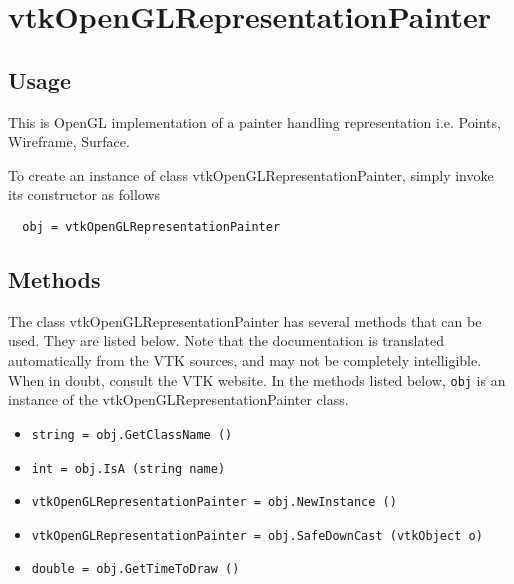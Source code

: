 \section{vtkOpenGLRepresentationPainter}

\subsection{Usage}

 This is OpenGL implementation of a painter handling representation 
 i.e. Points, Wireframe, Surface.

To create an instance of class vtkOpenGLRepresentationPainter, simply
invoke its constructor as follows
\begin{verbatim}
  obj = vtkOpenGLRepresentationPainter
\end{verbatim}
\subsection{Methods}

The class vtkOpenGLRepresentationPainter has several methods that can be used.
  They are listed below.
Note that the documentation is translated automatically from the VTK sources,
and may not be completely intelligible.  When in doubt, consult the VTK website.
In the methods listed below, \verb|obj| is an instance of the vtkOpenGLRepresentationPainter class.
\begin{itemize}
\item  \verb|string = obj.GetClassName ()|

\item  \verb|int = obj.IsA (string name)|

\item  \verb|vtkOpenGLRepresentationPainter = obj.NewInstance ()|

\item  \verb|vtkOpenGLRepresentationPainter = obj.SafeDownCast (vtkObject o)|

\item  \verb|double = obj.GetTimeToDraw ()|

\end{itemize}
